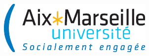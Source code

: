 
\begin{center}
	\begin{minipage}[c]{.5\linewidth}
		\raggedright\includegraphics[height=7em]{logo/logo_amu_excellence.eps}
	\end{minipage}\hfill
	\begin{minipage}[c]{.5\linewidth}
	\end{minipage}\hfill
\end{center}

\vspace{1em}

\begin{center}
	\begin{minipage}[c]{.63\linewidth}
		\dhorline{\textwidth}{4pt}
	\end{minipage}\hfill
	\begin{minipage}[c]{.35\linewidth}
		\raggedleft{}
	\end{minipage}\hfill
\end{center}

\doublespacing
\begin{flushleft}
    \titb{\HUGE\textcolor{cyanamu}{THÈSE DE DOCTORAT}}\\
	\\
	\\
\end{flushleft}
\vspace{2em}
\begin{center}
	\\
    \vspace{1em}
	\\%
\end{center}
\singlespacing

